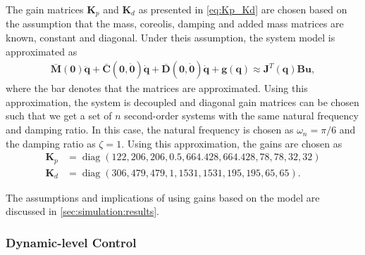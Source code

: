 The gain matrices $\bm{K}_p$ and $\bm{K}_d$ as presented in \autoref{eq:Kp_Kd}
are chosen based on the assumption that the mass, coreolis, damping and added mass
matrices are known, constant and diagonal. Under theis assumption, the system model is approximated
as
\begin{align}
    \bar{\bm{M}}(\bm{0}) \ddot{\bm{q}} + \bar{\bm{C}}(\bm{0}, \dot{\bm{0}}) \dot{\bm{q}} +
    \bar{\bm{D}}(\bm{0}, \dot{\bm{0}}) \dot{\bm{q}} + \bm{g}(\bm{q}) \approx \bm{J}^T(\bm{q}) \bm{B} \bm{u},
\end{align}
where the bar denotes that the matrices are approximated. Using this approximation,
the system is decoupled and diagonal gain matrices can be chosen such that we get
a set of $n$ second-order systems with the same natural frequency and damping ratio.
In this case, the natural frequency is chosen as $\omega_n = \pi/6$ and the damping ratio
as $\zeta = 1$. Using this approximation, the gains are chosen as
\begin{subequations}
\begin{align}
    \bm{K}_p &= \operatorname{diag}\left(122, 206, 206, 0.5, 664.428, 664.428, 78, 78, 32, 32\right) \\
    \bm{K}_d &= \operatorname{diag}\left(306, 479, 479, 1, 1531, 1531, 195, 195, 65, 65\right).
\end{align}
\end{subequations}

The assumptions and implications of using gains based on the model are discussed
in \autoref{sec:simulation:results}.

\subsubsection{Dynamic-level Control}

